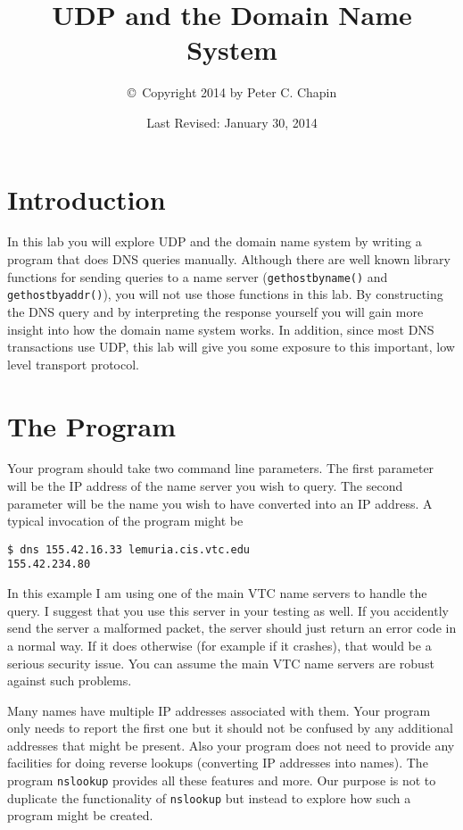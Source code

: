 \documentclass[twocolumn]{article}
\begin{document}
\title{UDP and the Domain Name System}
\author{\copyright\ Copyright 2014 by Peter C. Chapin}
\date{Last Revised: January 30, 2014}
\maketitle

\section*{Introduction}

In this lab you will explore UDP and the domain name system by writing a program that does DNS
queries manually. Although there are well known library functions for sending queries to a name
server (\texttt{gethostbyname()} and \texttt{gethostbyaddr()}), you will not use those functions
in this lab. By constructing the DNS query and by interpreting the response yourself you will
gain more insight into how the domain name system works. In addition, since most DNS
transactions use UDP, this lab will give you some exposure to this important, low level
transport protocol.

\section{The Program}

Your program should take two command line parameters. The first parameter will be the IP address
of the name server you wish to query. The second parameter will be the name you wish to have
converted into an IP address. A typical invocation of the program might be

\begin{verbatim}
$ dns 155.42.16.33 lemuria.cis.vtc.edu
155.42.234.80
\end{verbatim}

In this example I am using one of the main VTC name servers to handle the query. I suggest that
you use this server in your testing as well. If you accidently send the server a malformed
packet, the server should just return an error code in a normal way. If it does otherwise (for
example if it crashes), that would be a serious security issue. You can assume the main VTC
name servers are robust against such problems.

Many names have multiple IP addresses associated with them. Your program only needs to report
the first one but it should not be confused by any additional addresses that might be present.
Also your program does not need to provide any facilities for doing reverse lookups (converting
IP addresses into names). The program \texttt{nslookup} provides all these features and more.
Our purpose is not to duplicate the functionality of \texttt{nslookup} but instead to explore
how such a program might be created.
\end{document}
